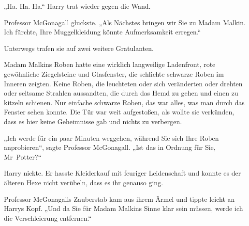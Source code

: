 „Ha. Ha. Ha.“ Harry trat wieder gegen die Wand.

Professor McGonagall gluckste. „Als Nächstes bringen wir Sie zu Madam Malkin. Ich fürchte, Ihre Muggelkleidung könnte Aufmerksamkeit erregen.“

Unterwegs trafen sie auf zwei weitere Gratulanten.

Madam Malkins Roben hatte eine wirklich langweilige Ladenfront, rote gewöhnliche Ziegelsteine und Glasfenster, die schlichte schwarze Roben im Inneren zeigten. Keine Roben, die leuchteten oder sich veränderten oder drehten oder seltsame Strahlen aussandten, die durch das Hemd zu gehen und einen zu kitzeln schienen. Nur einfache schwarze Roben, das war alles, was man durch das Fenster sehen konnte. Die Tür war weit aufgestoßen, als wollte sie verkünden, dass es hier keine Geheimnisse gab und nichts zu verbergen.

„Ich werde für ein paar Minuten weggehen, während Sie sich Ihre Roben anprobieren“, sagte Professor McGonagall. „Ist das in Ordnung für Sie, Mr~Potter?“

Harry nickte. Er hasste Kleiderkauf mit feuriger Leidenschaft und konnte es der älteren Hexe nicht verübeln, dass es ihr genauso ging.

Professor McGonagalls Zauberstab kam aus ihrem Ärmel und tippte leicht an Harrys Kopf. „Und da Sie für Madam Malkins Sinne klar sein müssen, werde ich die Verschleierung entfernen.“

